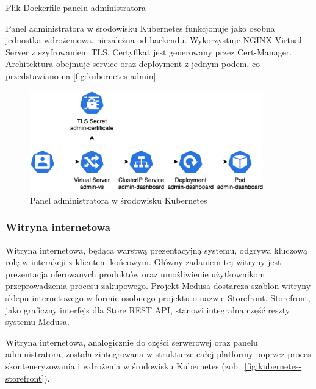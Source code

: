 \begin{listing}[H]
    \inputminted[xleftmargin=20pt,linenos]{docker}{code/Dockerfile.admin}
    \caption{Plik Dockerfile panelu administratora}
    \label{lst:medusajs-admin-dockerfile}
\end{listing}

Panel administratora w środowisku Kubernetes funkcjonuje jako osobna jednostka wdrożeniowa, niezależna od backendu.
Wykorzystuje NGINX Virtual Server z szyfrowaniem TLS. Certyfikat jest generowany przez Cert-Manager.
Architektura obejmuje service oraz deployment z jednym podem, co przedstawiano na \autoref{fig:kubernetes-admin}.

\begin{figure}[H]
    \centering
    \includegraphics[width=0.9\textwidth]{img/kubernetes-admin-panel}
    \caption{Panel administratora w środowisku Kubernetes}
    \label{fig:kubernetes-admin}
\end{figure}

\subsubsection{Witryna internetowa}

Witryna internetowa, będąca warstwą prezentacyjną systemu, odgrywa kluczową rolę w interakcji z klientem końcowym.
Główny zadaniem tej witryny jest prezentacja oferowanych produktów oraz umożliwienie użytkownikom przeprowadzenia procesu zakupowego.
Projekt Medusa dostarcza szablon witryny sklepu internetowego w formie osobnego projektu o nazwie Storefront.
Storefront, jako graficzny interfejs dla Store REST API, stanowi integralną część reszty systemu Medusa.

Witryna internetowa, analogicznie do części serwerowej oraz panelu administratora, została zintegrowana w strukturze całej platformy poprzez proces skonteneryzowania i wdrożenia w środowisku Kubernetes (zob.~\autoref{fig:kubernetes-storefront}).

